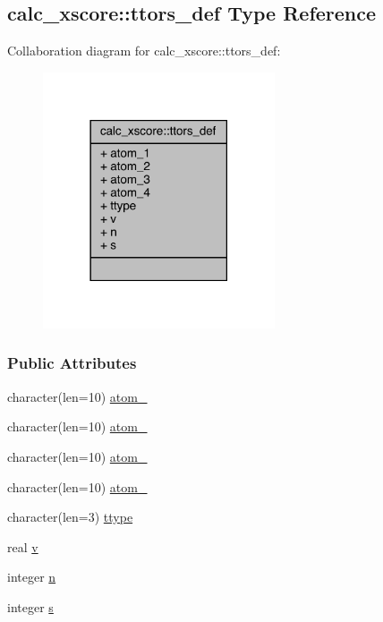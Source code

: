 \hypertarget{structcalc__xscore_1_1ttors__def}{\subsection{calc\-\_\-xscore\-:\-:ttors\-\_\-def Type Reference}
\label{structcalc__xscore_1_1ttors__def}
}


Collaboration diagram for calc\-\_\-xscore\-:\-:ttors\-\_\-def\-:
\nopagebreak
\begin{figure}[H]
\begin{center}
\leavevmode
\includegraphics[width=194pt]{structcalc__xscore_1_1ttors__def__coll__graph}
\end{center}
\end{figure}
\subsubsection*{Public Attributes}
\begin{DoxyCompactItemize}
\item 
character(len=10) \hyperlink{structcalc__xscore_1_1ttors__def_aaf870257e65e504e129e6f5c14ecbac8}{atom\-\_}
\item 
character(len=10) \hyperlink{structcalc__xscore_1_1ttors__def_a616996f493c0adac0e595557a99d9e64}{atom\-\_}
\item 
character(len=10) \hyperlink{structcalc__xscore_1_1ttors__def_af46d71a1fabd177a2bdbb99155c85e86}{atom\-\_}
\item 
character(len=10) \hyperlink{structcalc__xscore_1_1ttors__def_a49ee3badc67b5c358b99a9ce14c79929}{atom\-\_}
\item 
character(len=3) \hyperlink{structcalc__xscore_1_1ttors__def_a89c4c8ab426a69d9bdf27787d52a4b03}{ttype}
\item 
real \hyperlink{structcalc__xscore_1_1ttors__def_ad1993036f8e7af1389fa1b2e84b133b3}{v}
\item 
integer \hyperlink{structcalc__xscore_1_1ttors__def_a855957d6f039ce5dc0a2fcfef5ad7083}{n}
\item 
integer \hyperlink{structcalc__xscore_1_1ttors__def_a1954924797843071d592b35c684200f8}{s}
\end{DoxyCompactItemize}


